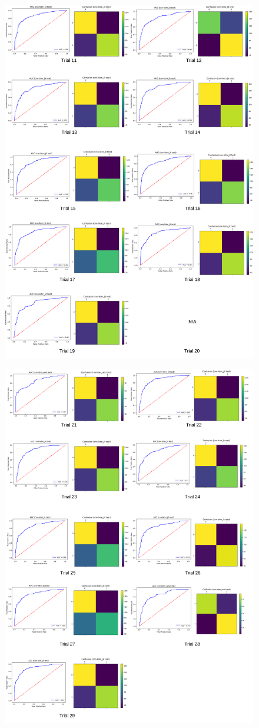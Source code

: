 \documentclass[format=sigconf, nonacm=true, review=false, screen=true]{acmart}
\begin{document}
\begin{figure}
    \centering
    \includegraphics[width=0.9\columnwidth]{figures/cnn-lstm_2.png}
    \label{fig:cnn-lstm_2}
\end{figure}
\begin{figure}
    \centering
    \includegraphics[width=0.9\columnwidth]{figures/cnn-lstm_3.png}
    \label{fig:cnn-lstm_3}
\end{figure}
\end{document}
